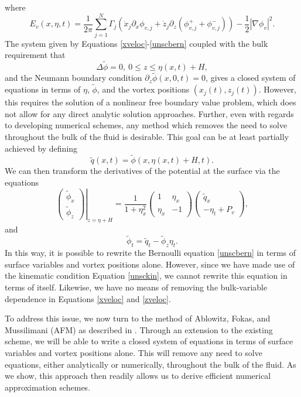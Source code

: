\documentclass[a4paper,11pt]{article}
\newcommand{\bp}{\begin{pmatrix}}
\newcommand{\ep}{\end{pmatrix}}
\newcommand{\p}{\partial}
\begin{document}
where
\[
E_{v}(x,\eta,t) = \frac{1}{2\pi}\sum_{j=1}^{N}\Gamma_{j}\left(\dot{x}_{j}\p_{x}\phi_{v,j} + \dot{z}_{j} \p_{z}\left(\phi_{v,j}^{+} + \phi_{v,j}^{-}\right)  \right) - \frac{1}{2}\left| \nabla \phi_{v} \right|^{2}.
\]
The system given by Equations \eqref{xveloc}-\eqref{unscbern} coupled with the bulk requirement that 
\begin{equation}
\Delta \tilde{\phi} = 0, ~ 0\leq z \leq \eta(x,t)+H,
\label{harmon} 
\end{equation}
and the Neumann boundary condition $\p_{z}\tilde{\phi}(x,0,t)=0$, gives a closed system of equations in terms of $\eta$, $\tilde{\phi}$, and the vortex positions $(x_{j}(t),z_{j}(t))$.  However, this requires the solution of a nonlinear free boundary value problem, which does not allow for any direct analytic solution approaches.  Further, even with regards to developing numerical schemes, any method which removes the need to solve throughout the bulk of the fluid is desirable.
This goal can be at least partially achieved by defining 
\[
\tilde{q}(x,t) = \tilde{\phi}(x,\eta(x,t)+H,t).
\]
We can then transform the derivatives of the potential at the surface via the equations
\begin{equation}
\left.\bp\tilde{\phi}_{x}\\ \tilde{\phi}_{z}\ep\right|_{z=\eta + H} = \frac{1}{1+\eta_{x}^{2}}\bp 1 & \eta_{x}\\ \eta_{x} & -1\ep\bp\tilde{q}_{x} \\  -\eta_{t} + P_{v}\ep,
\label{phitrans}
\end{equation}
and
\begin{equation}
\tilde{\phi}_{t} = \tilde{q}_{t}-\tilde{\phi}_{z}\eta_{t}.
\label{phittrans}
\end{equation}
In this way, it is possible to rewrite the Bernoulli equation \eqref{unscbern} in terms of surface variables and vortex positions alone.  However, since we have made use of the kinematic condition Equation \eqref{unsckin}, we cannot rewrite this equation in terms of itself.  Likewise, we have no means of removing the bulk-variable dependence in Equations \eqref{xveloc} and \eqref{zveloc}.

To address this issue, we now turn to the method of Ablowitz, Fokas, and Mussilimani (AFM) as described in \cite{afm}.  Through an extension to the existing scheme, we will be able to write a closed system of equations in terms of surface variables and vortex positions alone.  This will remove any need to solve equations, either analytically or numerically, throughout the bulk of the fluid.  As we show, this approach then readily allows us to derive efficient numerical approximation schemes.
\end{document}

